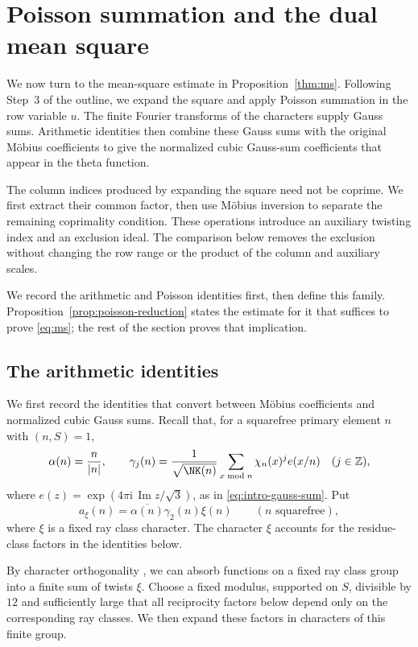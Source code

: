 \section{Poisson summation and the dual mean square}\label{sec:initialization}

We now turn to the mean-square estimate in Proposition~\ref{thm:ms}.
Following Step~3 of the outline, we expand the square and apply
Poisson summation in the row variable $u$. The finite Fourier
transforms of the characters supply Gauss sums. Arithmetic identities
then combine these Gauss sums with the original M\"obius coefficients
to give the normalized cubic Gauss-sum coefficients that appear in the theta
function.

The column indices produced by expanding the square need not be
coprime. We first extract their common factor, then use M\"obius
inversion to separate the remaining coprimality condition. These
operations introduce an auxiliary twisting index and an exclusion
ideal. The comparison below removes the exclusion without changing
the row range or the product of the column and auxiliary scales.

We record the arithmetic and Poisson identities first, then define
this family. Proposition~\ref{prop:poisson-reduction} states the
estimate for it that suffices to prove \eqref{eq:ms}; the rest of
the section proves that implication.

\subsection{The arithmetic identities}
We first record the identities that convert between M\"obius
coefficients and normalized cubic Gauss sums. Recall that, for a
squarefree primary element $n$ with $(n,S)=1$,
\[
 \alpha(n)=\frac{n}{|n|},\qquad
 \gamma_j(n)=\frac{1}{\sqrt{\NK(n)}}
       \sum_{x\bmod n}\chi_n(x)^j e(x/n)\quad(j\in\mathbb Z),
\]
where $e(z)=\exp(4\pi\mathrm i\,\operatorname{Im}z/\sqrt3)$, as in
\eqref{eq:intro-gauss-sum}. Put
\[
 a_\xi(n)=\overline{\alpha(n)}\gamma_2(n)\xi(n)
 \qquad(n\text{ squarefree}),
\]
where $\xi$ is a fixed ray class character. The character $\xi$ accounts for the
residue-class factors in the identities below.

By character orthogonality \cite[\S3.1]{IK04}, we can absorb functions
on a fixed ray class group into a finite sum of twists $\xi$.
Choose a fixed modulus, supported on $S$, divisible by $12$
and sufficiently large that all reciprocity factors below
depend only on the corresponding ray classes. We then expand these
factors in characters of this finite group.

